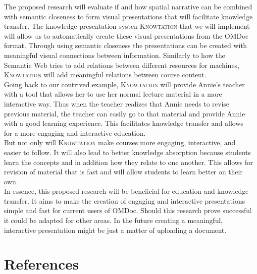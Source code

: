 \documentclass[twoside]{article}
\newcommand{\sys}{\textsc{Knowtation}\xspace}
\begin{document}
The proposed research will evaluate if and how spatial narrative can be combined with semantic closeness to form visual presentations that will facilitate knowledge transfer. The knowledge presentation systen \sys that we will implement will allow us to automatically create these visual presentations from the OMDoc format. Through using semantic closeness the presentations can be created with meaningful visual connections between information. Similarly to how the Semantic Web tries to add relations between different resources for machines, \sys will add meaningful relations between course content.\\

Going back to our contrived example, \sys will provide Annie's teacher with a tool that allows her to use her normal lecture material in a more interactive way. Thus when the teacher realizes that Annie needs to revise previous material, the teacher can easily go to that material and provide Annie with a good learning experience. This facilitates knowledge transfer and allows for a more engaging and interactive education.\\

But not only will \sys make courses more engaging, interactive, and easier to follow. It will also lead to better knowledge absorption because students learn the concepts and in addition how they relate to one another. This allows for revision of material that is fast and will allow students to learn better on their own. \\

In essence, this proposed research will be beneficial for education and knowledge transfer. It aims to make the creation of engaging and interactive presentations simple and fast for current users of OMDoc. Should this research prove successful it could be adapted for other areas. In the future creating a meaningful, interactive presentation might be just a matter of uploading a document.

\newpage
\section{References}

{}

\end{document}
